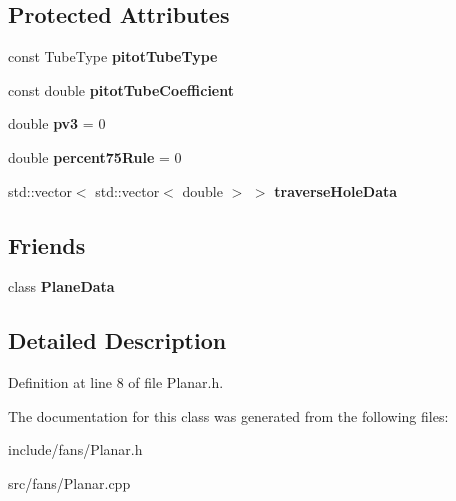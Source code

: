 \subsection*{Protected Attributes}
\begin{DoxyCompactItemize}
\item 
\mbox{\label{class_velocity_pressure_traverse_data_a344fee802de9fa9f8f203bf35d312576}} 
const Tube\+Type {\bfseries pitot\+Tube\+Type}
\item 
\mbox{\label{class_velocity_pressure_traverse_data_a5f0d183ca647bc7eef7f7c7a44a9c23e}} 
const double {\bfseries pitot\+Tube\+Coefficient}
\item 
\mbox{\label{class_velocity_pressure_traverse_data_ae8ed6cb6fa7aeec774383671c38bc21b}} 
double {\bfseries pv3} = 0
\item 
\mbox{\label{class_velocity_pressure_traverse_data_aaae013760883326c1c15bc0e2a27cd34}} 
double {\bfseries percent75\+Rule} = 0
\item 
\mbox{\label{class_velocity_pressure_traverse_data_a02b06c3211e4fb15fdba68127a9855a8}} 
std\+::vector$<$ std\+::vector$<$ double $>$ $>$ {\bfseries traverse\+Hole\+Data}
\end{DoxyCompactItemize}
\subsection*{Friends}
\begin{DoxyCompactItemize}
\item 
\mbox{\label{class_velocity_pressure_traverse_data_a28ff438eefb65e97bddb4051dd0a0112}} 
class {\bfseries Plane\+Data}
\end{DoxyCompactItemize}


\subsection{Detailed Description}


Definition at line 8 of file Planar.\+h.



The documentation for this class was generated from the following files\+:\begin{DoxyCompactItemize}
\item 
include/fans/Planar.\+h\item 
src/fans/Planar.\+cpp\end{DoxyCompactItemize}
